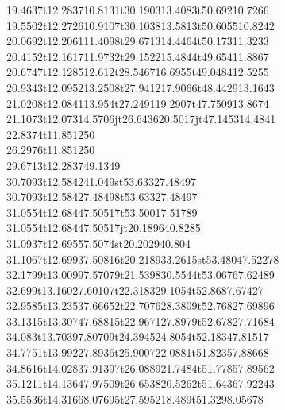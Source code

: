 \documentclass[draft]{article}
\makeatletter
\DeclareRobustCommand{\_}{%
  \ifmmode \nfss@text{\textunderscore}\else \BreakableUnderscore \fi}
\makeatother
\begin{document}
{{19.4637}t{12.2837}{10.8131}t{30.1903}{13.4083}t{50.692}{10.7266}\\%
{19.5502}t{12.2726}{10.9107}t{30.1038}{13.5813}t{50.6055}{10.8242}\\%
{20.0692}t{12.2061}{11.4098}t{29.6713}{14.4464}t{50.173}{11.3233}\\%
{20.4152}t{12.1617}{11.9732}t{29.1522}{15.4844}t{49.654}{11.8867}\\%
{20.6747}t{12.1285}{12.612}t{28.5467}{16.6955}t{49.0484}{12.5255}\\%
{20.9343}t{12.0952}{13.2508}t{27.9412}{17.9066}t{48.4429}{13.1643}\\%
{21.0208}t{12.0841}{13.954}t{27.2491}{19.2907}t{47.7509}{13.8674}\\%
{21.1073}t{12.073}{14.5706}jt{26.6436}{20.5017}jt{47.1453}{14.4841}\\%
{22.8374}t{11.8512}{50}\\%
{26.2976}t{11.8512}{50}\\%
{29.6713}t{12.2837}{49.1349}\\%
{30.7093}t{12.5842}{41.049}st{53.6332}{7.48497}\\%
{30.7093}t{12.5842}{7.48498}t{53.6332}{7.48497}\\%
{31.0554}t{12.6844}{7.50517}t{53.5001}{7.51789}\\%
{31.0554}t{12.6844}{7.50517}jt{20.1896}{40.8285}\\%
{31.0937}t{12.6955}{7.5074}st{20.2029}{40.804}\\%
{31.1067}t{12.6993}{7.50816}t{20.2189}{33.2615}st{53.4804}{7.52278}\\%
{32.1799}t{13.0099}{7.57079}t{21.5398}{30.5544}t{53.0676}{7.62489}\\%
{32.699}t{13.1602}{7.60107}t{22.3183}{29.1054}t{52.868}{7.67427}\\%
{32.9585}t{13.2353}{7.66652}t{22.7076}{28.3809}t{52.7682}{7.69896}\\%
{33.1315}t{13.3074}{7.68815}t{22.9671}{27.8979}t{52.6782}{7.71684}\\%
{34.083}t{13.7039}{7.80709}t{24.3945}{24.8054}t{52.1834}{7.81517}\\%
{34.7751}t{13.9922}{7.8936}t{25.9007}{22.0881}t{51.8235}{7.88668}\\%
{34.8616}t{14.0283}{7.91397}t{26.0889}{21.7484}t{51.7785}{7.89562}\\%
{35.1211}t{14.1364}{7.97509}t{26.6538}{20.5262}t{51.6436}{7.92243}\\%
{35.5536}t{14.3166}{8.07695}t{27.5952}{18.489}t{51.329}{8.05678}\\%
}
\end{document}
